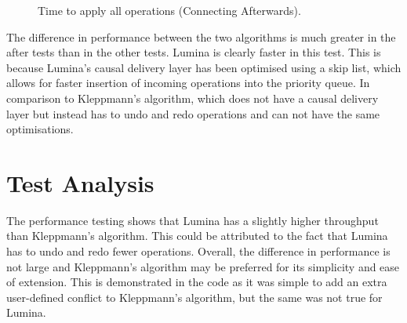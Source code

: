 \documentclass[12pt]{report}
\begin{document}
\begin{figure}[H]
\caption{Time to apply all operations (Connecting Afterwards).}
\label{fig:after_test}
\end{figure}

The difference in performance between the two algorithms is much greater in the after tests than in the other tests. Lumina is clearly faster in this test. This is because Lumina's causal delivery layer has been optimised using a skip list, which allows for faster insertion of incoming operations into the priority queue. In comparison to Kleppmann's algorithm, which does not have a causal delivery layer but instead has to undo and redo operations and can not have the same optimisations.

\section{Test Analysis}
The performance testing shows that Lumina has a slightly higher throughput than Kleppmann's algorithm. This could be attributed to the fact that Lumina has to undo and redo fewer operations. Overall, the difference in performance is not large and Kleppmann's algorithm may be preferred for its simplicity and ease of extension. This is demonstrated in the code as it was simple to add an extra user-defined conflict to Kleppmann's algorithm, but the same was not true for Lumina. \par
\end{document}
